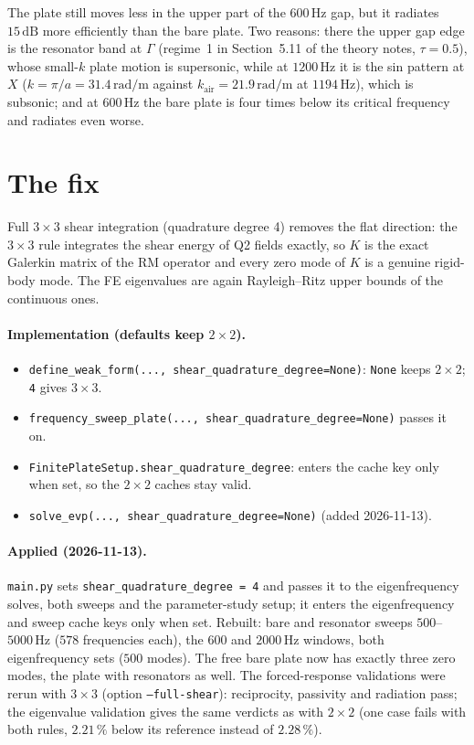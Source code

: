 The plate still moves less in the upper part of the $600\,\mathrm{Hz}$ gap, but it
radiates $15\,\mathrm{dB}$ more efficiently than the bare plate. Two reasons: there the
upper gap edge is the resonator band at $\Gamma$ (regime~1 in Section~5.11 of the theory notes, $\tau = 0.5$), whose small-$k$ plate motion is
supersonic, while at $1200\,\mathrm{Hz}$ it is the sin pattern at $X$
($k = \pi/a = 31.4\,\mathrm{rad/m}$ against $k_\mathrm{air} = 21.9\,\mathrm{rad/m}$ at
$1194\,\mathrm{Hz}$), which is subsonic; and at $600\,\mathrm{Hz}$ the bare plate is
four times below its critical frequency and radiates even worse.

\section{The fix}

Full $3\times 3$ shear integration (quadrature degree 4) removes the flat direction:
the $3\times 3$ rule integrates the shear energy of Q2 fields exactly, so $K$ is the
exact Galerkin matrix of the RM operator and every zero mode of $K$ is a genuine
rigid-body mode. The FE eigenvalues are again Rayleigh--Ritz upper bounds of the
continuous ones.

\paragraph{Implementation (defaults keep $2\times 2$).}
\begin{itemize}
  \item \texttt{define\_weak\_form(..., shear\_quadrature\_degree=None)}: \texttt{None}
        keeps $2\times 2$; \texttt{4} gives $3\times 3$.
  \item \texttt{frequency\_sweep\_plate(..., shear\_quadrature\_degree=None)} passes it on.
  \item \texttt{FinitePlateSetup.shear\_quadrature\_degree}: enters the cache key only
        when set, so the $2\times 2$ caches stay valid.
  \item \texttt{solve\_evp(..., shear\_quadrature\_degree=None)} (added 2026-11-13).
\end{itemize}
\paragraph{Applied (2026-11-13).} \texttt{main.py} sets
\texttt{shear\_quadrature\_degree = 4} and passes it to the eigenfrequency solves, both
sweeps and the parameter-study setup; it enters the eigenfrequency and sweep cache keys
only when set. Rebuilt: bare and resonator sweeps $500$--$5000\,\mathrm{Hz}$
($578$ frequencies each), the $600$ and $2000\,\mathrm{Hz}$ windows, both eigenfrequency
sets ($500$ modes). The free bare plate now has exactly three zero modes, the plate
with resonators as well. The forced-response validations were rerun with $3\times 3$
(option \texttt{--full-shear}): reciprocity, passivity and radiation pass; the
eigenvalue validation gives the same verdicts as with $2\times 2$ (one case fails with
both rules, $2.21\,\%$ below its reference instead of $2.28\,\%$).


